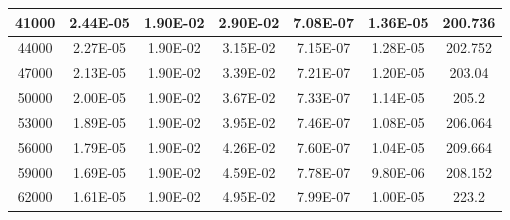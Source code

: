 \documentclass[11pt, a4paper, twocolumn]{article}
\begin{document}
\begin{table}[H]
{\begin{tabular}{|c|c|c|c|c|c|c|}
41000          & 2.44E-05               & 1.90E-02                      & 2.90E-02        & 7.08E-07            & 1.36E-05     & 200.736           \\ \hline
44000          & 2.27E-05               & 1.90E-02                      & 3.15E-02        & 7.15E-07            & 1.28E-05     & 202.752           \\ \hline
47000          & 2.13E-05               & 1.90E-02                      & 3.39E-02        & 7.21E-07            & 1.20E-05     & 203.04            \\ \hline
50000          & 2.00E-05               & 1.90E-02                      & 3.67E-02        & 7.33E-07            & 1.14E-05     & 205.2             \\ \hline
53000          & 1.89E-05               & 1.90E-02                      & 3.95E-02        & 7.46E-07            & 1.08E-05     & 206.064           \\ \hline
56000          & 1.79E-05               & 1.90E-02                      & 4.26E-02        & 7.60E-07            & 1.04E-05     & 209.664           \\ \hline
59000          & 1.69E-05               & 1.90E-02                      & 4.59E-02        & 7.78E-07            & 9.80E-06     & 208.152           \\ \hline
62000          & 1.61E-05               & 1.90E-02                      & 4.95E-02        & 7.99E-07            & 1.00E-05     & 223.2             \\ \hline
\end{tabular}%
}
\end{table}
\end{document}
